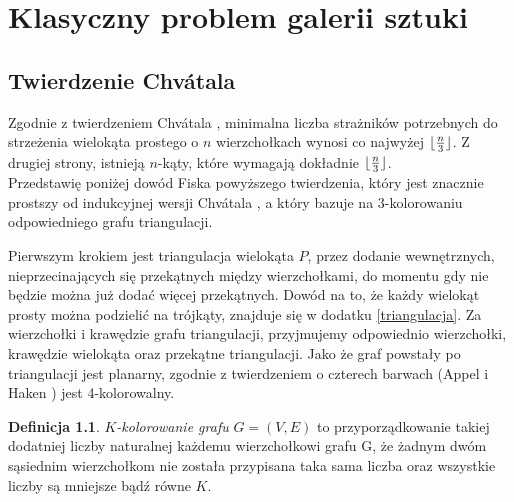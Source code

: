 \documentclass[brudnopis]{xmgr}
\DeclarePairedDelimiter\floor{\lfloor}{\rfloor}
\theoremstyle{definition}
\newtheorem{Definicja}{Definicja}
\begin{document}
\chapter{Klasyczny problem galerii sztuki}

\section{Twierdzenie Chv\'atala}
Zgodnie z twierdzeniem Chv\'atala \cite{chvatal} \label{tw chvatala}, minimalna liczba strażników potrzebnych do strzeżenia wielokąta prostego o $n$ wierzchołkach wynosi co najwyżej $\floor{\frac{n}{3}}$.
Z drugiej strony, istnieją $n$-kąty, które wymagają dokładnie $\floor{\frac{n}{3}}$.
\\Przedstawię poniżej dowód Fiska \cite{fisk} powyższego twierdzenia, który jest znacznie prostszy od indukcyjnej wersji Chv\'atala \cite{chvatal}, a który bazuje na $3$-kolorowaniu odpowiedniego grafu triangulacji. 

Pierwszym krokiem jest triangulacja wielokąta $P$, przez dodanie wewnętrznych, nieprzecinających się przekątnych między wierzchołkami, do momentu gdy nie będzie można już dodać więcej przekątnych. 
Dowód na to, że każdy wielokąt prosty można podzielić na trójkąty, znajduje się w dodatku \ref{triangulacja}.
Za wierzchołki i krawędzie grafu triangulacji, przyjmujemy odpowiednio wierzchołki, krawędzie wielokąta oraz przekątne triangulacji. Jako że graf powstały po triangulacji jest planarny, zgodnie z twierdzeniem o czterech barwach (Appel i Haken \cite{appel}) jest 4-kolorowalny.

\begin{Definicja} 
   \emph{$K$-kolorowanie grafu} $G = (V,E)$ to przyporządkowanie takiej dodatniej liczby naturalnej każdemu wierzchołkowi grafu G, że żadnym dwóm sąsiednim wierzchołkom nie została przypisana taka sama liczba oraz wszystkie liczby są mniejsze bądź równe $K$.
\end{Definicja}
\end{document}
